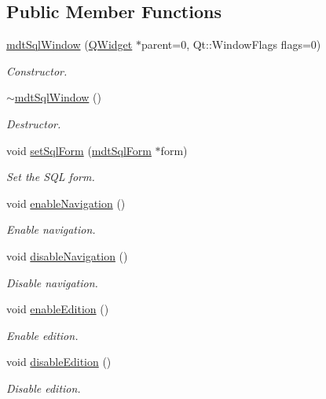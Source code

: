 \subsection*{Public Member Functions}
\begin{DoxyCompactItemize}
\item 
\hyperlink{classmdt_sql_window_a8624cc7a7a454e759c753c2faddd46e6}{mdt\-Sql\-Window} (\hyperlink{class_q_widget}{Q\-Widget} $\ast$parent=0, Qt\-::\-Window\-Flags flags=0)
\begin{DoxyCompactList}\small\item\em Constructor. \end{DoxyCompactList}\item 
\hyperlink{classmdt_sql_window_a050588d255a48722438421b754b808f3}{$\sim$mdt\-Sql\-Window} ()
\begin{DoxyCompactList}\small\item\em Destructor. \end{DoxyCompactList}\item 
void \hyperlink{classmdt_sql_window_ad9a237b7bea72d92a4743f09c28e38ae}{set\-Sql\-Form} (\hyperlink{classmdt_sql_form}{mdt\-Sql\-Form} $\ast$form)
\begin{DoxyCompactList}\small\item\em Set the S\-Q\-L form. \end{DoxyCompactList}\item 
void \hyperlink{classmdt_sql_window_a6d4d853c8c64a99ff2e396b99ea63a87}{enable\-Navigation} ()
\begin{DoxyCompactList}\small\item\em Enable navigation. \end{DoxyCompactList}\item 
void \hyperlink{classmdt_sql_window_a961d587d63b0997a10db6728773a108f}{disable\-Navigation} ()
\begin{DoxyCompactList}\small\item\em Disable navigation. \end{DoxyCompactList}\item 
void \hyperlink{classmdt_sql_window_a42d1283a05eddd2a48af74cf764ef240}{enable\-Edition} ()
\begin{DoxyCompactList}\small\item\em Enable edition. \end{DoxyCompactList}\item 
void \hyperlink{classmdt_sql_window_a629fa57fcdde0e4db0fc93efd84c9123}{disable\-Edition} ()
\begin{DoxyCompactList}\small\item\em Disable edition. \end{DoxyCompactList}\end{DoxyCompactItemize}


